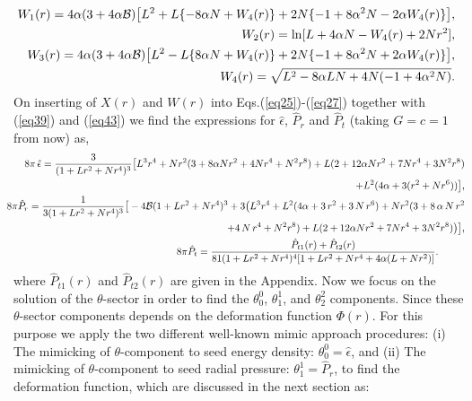 \documentclass[]{aastex631}
\begin{document}
\begin{eqnarray}
&&\hspace{-0.5cm} W_1(r)=4 \alpha (3 + 4 \alpha \mathcal{B}) \big[L^2 + L \{-8 \alpha N + W_4(r)\} + 2 N \{-1 + 8 \alpha^2 N - 2 \alpha W_4(r)\}\big],\nonumber\\
&&\hspace{-0.5cm} W_2(r)=\ln[L + 4 \alpha N - W_4(r)+2 N r^2],\nonumber\\
&&\hspace{-0.5cm} W_3(r)=4 \alpha (3 + 4 \alpha \mathcal{B}) \big[L^2 -L \{8 \alpha N + W_4(r)\}  + 2 N \{-1 + 8 \alpha^2 N + 2 \alpha W_4(r)\}\big],\nonumber\\
&&\hspace{-0.5cm} W_4(r)=\sqrt{L^2 - 8 \alpha L N + 4 N (-1 + 4 \alpha^2 N)}.\nonumber
\end{eqnarray}
On inserting of $X(r)$ and $W(r)$ into Eqs.(\ref{eq25})-(\ref{eq27}) together with (\ref{eq39}) and (\ref{eq43}) we find the expressions for $\hat{\epsilon}$, $\hat{P}_r$ and $\hat{P}_t$ (taking $G=c=1$ from now) as, 
\begin{eqnarray}
&& \hspace{-0.6cm} 8\pi\,\hat{\epsilon}= \frac{3}{(1 + L r^2 + N r^4)^3} \big[L^3 r^4 + N r^2 (3 + 8 \alpha N r^2 + 4 N r^4 + N^2 r^8) + L (2 + 12 \alpha N r^2 + 7 N r^4 + 3 N^2 r^8) \nonumber\\
&& \hspace{0.4cm} + L^2 (4 \alpha  + 3 (r^2 + N r^6))\big],  \label{eq47}\\
&& \hspace{-0.6cm} 8\pi \hat{P}_r= \frac{1}{3 (1 + L r^2 + N r^4)^3} \big[-4 \mathcal{B} (1 + L r^2 + N r^4)^3 + 
 3 \big(L^3 r^4 + L^2 (4 \alpha + 3\, r^2 + 3\, N\, r^6) + N r^2 (3 + 8 \, \alpha \,N \,r^2 \nonumber\\
 && \hspace{0.4cm} + 4\, N\, r^4  + N^2 r^8) +L (2 + 12 \alpha N r^2 + 7 N r^4 + 3 N^2 r^8)\big) \big],  \label{eq48}\\
&& \hspace{-0.6cm}  8\pi \hat{P}_t=\frac{\hat{P}_{t1}(r)+\hat{P}_{t2}(r)}{81 (1 + L r^2 + N r^4)^4 [1 + L r^2 + N r^4 + 4 \alpha (L + N r^2)]}.~~~~~~~~ \label{eq49}
\end{eqnarray}
where $\hat{P}_{t1}(r)$ and $\hat{P}_{t2}(r)$ are given in the Appendix. Now we focus on the solution of the  $\theta$-sector in order to find the $\theta^0_0$, $\theta^1_1$, and $\theta^2_2$ components. Since these $\theta$-sector components depends on the deformation function $\Phi(r)$. For this purpose we apply the two different well-known mimic approach procedures: (i) The mimicking of $\theta$-component to seed energy density: $\theta^0_0=\hat{\epsilon}$, and (ii) The mimicking of $\theta$-component to seed radial pressure: $\theta^1_1=\hat{P}_r$, to find the deformation function, which are discussed in the next section as: 
\end{document}
